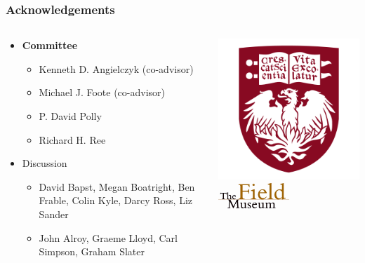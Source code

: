 \documentclass{beamer}
\begin{document}
\begin{frame}
  \frametitle{Acknowledgements}
  \begin{columns}
    \begin{column}{0.5\textwidth}
      \begin{itemize}
        \item \textbf{Committee}
          \begin{itemize}
            \item Kenneth D. Angielczyk (co-advisor)
            \item Michael J. Foote (co-advisor)
            \item P. David Polly
            \item Richard H. Ree
          \end{itemize}
        \item Discussion
          \begin{itemize}
            \item David Bapst, Megan Boatright, Ben Frable, Colin Kyle, Darcy Ross, Liz Sander
            \item John Alroy, Graeme Lloyd, Carl Simpson, Graham Slater
          \end{itemize}
      \end{itemize}
    \end{column}
    \begin{column}{0.5\textwidth}
      \includegraphics[height = 0.3\textheight, keepaspectratio = true]{figure/chicago} \\
      \includegraphics[height = 0.3\textheight, width = 0.5\textwidth, keepaspectratio = true]{figure/field} \\
    \end{column}
  \end{columns}
\end{frame}
\end{document}
